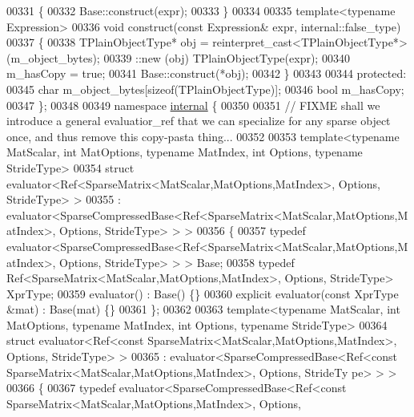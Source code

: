 \begin{DoxyCode}
00331     \{
00332       Base::construct(expr);
00333     \}
00334 
00335     \textcolor{keyword}{template}<\textcolor{keyword}{typename} Expression>
00336     \textcolor{keywordtype}{void} construct(\textcolor{keyword}{const} Expression& expr, internal::false\_type)
00337     \{
00338       TPlainObjectType* obj = \textcolor{keyword}{reinterpret\_cast<}TPlainObjectType*\textcolor{keyword}{>}(m\_object\_bytes);
00339       ::new (obj) TPlainObjectType(expr);
00340       m\_hasCopy = \textcolor{keyword}{true};
00341       Base::construct(*obj);
00342     \}
00343 
00344   \textcolor{keyword}{protected}:
00345     \textcolor{keywordtype}{char} m\_object\_bytes[\textcolor{keyword}{sizeof}(TPlainObjectType)];
00346     \textcolor{keywordtype}{bool} m\_hasCopy;
00347 \};
00348 
00349 \textcolor{keyword}{namespace }\hyperlink{namespaceinternal}{internal} \{
00350 
00351 \textcolor{comment}{// FIXME shall we introduce a general evaluatior\_ref that we can specialize for any sparse object once, and
       thus remove this copy-pasta thing...}
00352 
00353 \textcolor{keyword}{template}<\textcolor{keyword}{typename} MatScalar, \textcolor{keywordtype}{int} MatOptions, \textcolor{keyword}{typename} MatIndex, \textcolor{keywordtype}{int} Options, \textcolor{keyword}{typename} Str\textcolor{keywordtype}{id}eType>
00354 \textcolor{keyword}{struct }evaluator<Ref<SparseMatrix<MatScalar,MatOptions,MatIndex>, Options, StrideType> >
00355   : evaluator<SparseCompressedBase<Ref<SparseMatrix<MatScalar,MatOptions,MatIndex>, Options, StrideType> > 
      >
00356 \{
00357   \textcolor{keyword}{typedef} evaluator<SparseCompressedBase<Ref<SparseMatrix<MatScalar,MatOptions,MatIndex>, Options, 
      StrideType> > > Base;
00358   \textcolor{keyword}{typedef} Ref<SparseMatrix<MatScalar,MatOptions,MatIndex>, Options, StrideType> XprType;  
00359   evaluator() : Base() \{\}
00360   \textcolor{keyword}{explicit} evaluator(\textcolor{keyword}{const} XprType &mat) : Base(mat) \{\}
00361 \};
00362 
00363 \textcolor{keyword}{template}<\textcolor{keyword}{typename} MatScalar, \textcolor{keywordtype}{int} MatOptions, \textcolor{keyword}{typename} MatIndex, \textcolor{keywordtype}{int} Options, \textcolor{keyword}{typename} Str\textcolor{keywordtype}{id}eType>
00364 \textcolor{keyword}{struct }evaluator<Ref<const SparseMatrix<MatScalar,MatOptions,MatIndex>, Options, StrideType> >
00365   : evaluator<SparseCompressedBase<Ref<const SparseMatrix<MatScalar,MatOptions,MatIndex>, Options, StrideTy
      pe> > >
00366 \{
00367   \textcolor{keyword}{typedef} evaluator<SparseCompressedBase<Ref<const SparseMatrix<MatScalar,MatOptions,MatIndex>, Options, 

\end{DoxyCode}

